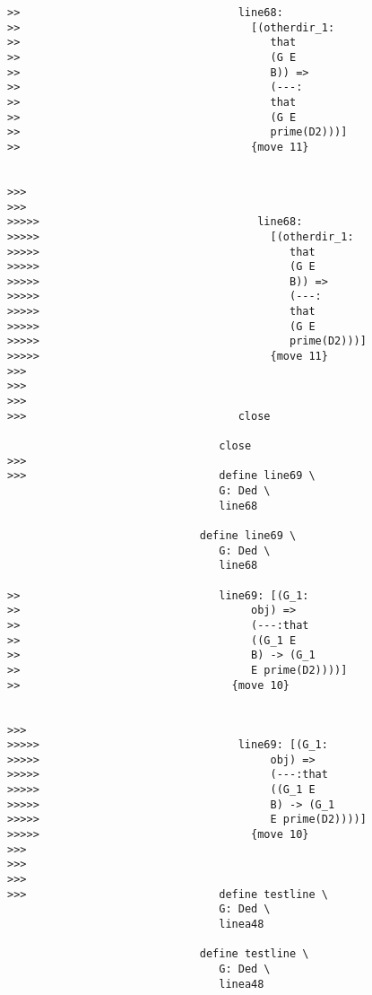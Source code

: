 \documentclass[12pt]{article}
\begin{document}
\begin{verbatim}
>>                                  line68:
>>                                    [(otherdir_1:
>>                                       that
>>                                       (G E
>>                                       B)) =>
>>                                       (---:
>>                                       that
>>                                       (G E
>>                                       prime(D2)))]
>>                                    {move 11}


>>>
>>>
>>>>>                                  line68:
>>>>>                                    [(otherdir_1:
>>>>>                                       that
>>>>>                                       (G E
>>>>>                                       B)) =>
>>>>>                                       (---:
>>>>>                                       that
>>>>>                                       (G E
>>>>>                                       prime(D2)))]
>>>>>                                    {move 11}
>>>
>>>
>>>
>>>                                 close

                                 close
>>>
>>>                              define line69 \
                                 G: Ded \
                                 line68

                              define line69 \
                                 G: Ded \
                                 line68

>>                               line69: [(G_1:
>>                                    obj) =>
>>                                    (---:that
>>                                    ((G_1 E
>>                                    B) -> (G_1
>>                                    E prime(D2))))]
>>                                 {move 10}


>>>
>>>>>                               line69: [(G_1:
>>>>>                                    obj) =>
>>>>>                                    (---:that
>>>>>                                    ((G_1 E
>>>>>                                    B) -> (G_1
>>>>>                                    E prime(D2))))]
>>>>>                                 {move 10}
>>>
>>>
>>>
>>>                              define testline \
                                 G: Ded \
                                 linea48

                              define testline \
                                 G: Ded \
                                 linea48


\end{verbatim}
\end{document}
